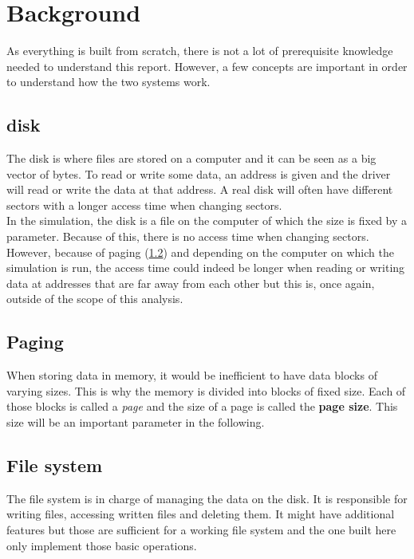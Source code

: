 \documentclass[10pt,a4paper]{ULBreport}
\begin{document}
\chapter{Background}

As everything is built from scratch, there is not a lot of prerequisite knowledge needed to understand this report. However, a few concepts are important in order to understand how the two systems work.

\section{disk}
\label{sec:disk}

The disk is where files are stored on a computer and it can be seen as a big vector of bytes. To read or write some data, an address is given and the driver will read or write the data at that address. A real disk will often have different sectors with a longer access time when changing sectors. \\

In the simulation, the disk is a file on the computer of which the size is fixed by a parameter. Because of this, there is no access time when changing sectors. However, because of paging (\ref{sec:paging}) and depending on the computer on which the simulation is run, the access time could indeed be longer when reading or writing data at addresses that are far away from each other but this is, once again, outside of the scope of this analysis. \\

\section{Paging}
\label{sec:paging}

When storing data in memory, it would be inefficient to have data blocks of varying sizes. This is why the memory is divided into blocks of fixed size. Each of those blocks is called a \textit{page} and the size of a page is called the \textbf{page size}. This size will be an important parameter in the following.

\section{File system}
\label{sec:filesystem}

The file system is in charge of managing the data on the disk. It is responsible for writing files, accessing written files and deleting them. It might have additional features but those are sufficient for a working file system and the one built here only implement those basic operations.
\end{document}
